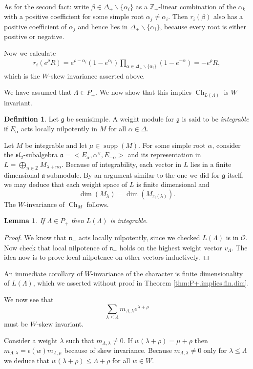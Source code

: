 \documentclass[12pt]{article}
\theoremstyle{plain}
\newtheorem{lemma}[thm]{Lemma}
\theoremstyle{definition}
\newtheorem{defn}{Definition}[section]
\numberwithin{equation}{section}
\DeclareMathOperator{\supp}{supp}
\DeclareMathOperator{\ch}{Ch}
\newcommand{\al}{\alpha}
\newcommand{\la}{\lambda}
\newcommand{\La}{\Lambda}
\newcommand{\eps}{\epsilon}
\newcommand{\D}{\Delta}
\newcommand{\Z}{\mathbb{Z}}
\newcommand{\g}{\mathfrak{g}}
\newcommand{\n}{\mathfrak{n}}
\newcommand{\sll}{\mathfrak{sl}}
\newcommand{\OO}{\mathcal{O}}
\newcommand{\ma}{\mathfrak{a}}
\begin{document}
As for the second fact: write $\beta \in \D_+ \backslash \{\al_i\}$ as a $\Z_+$-linear combination of the $\al_k$ with a positive coefficient for some simple root $\al_j \neq \al_i$. Then $r_i(\beta)$ also has a positive coefficient of $\al_j$ and hence lies in $\D_+ \backslash \{\al_i\}$, because every root is either positive or negative.

Now we calculate
\begin{align*}
r_i(e^\rho R)
%
= e^{\rho-\al_i} (1 - e^{\al_i}) \prod_{\al \in \D_+ \backslash \{\al_i\}} (1 - e^{-\al})
%
= -e^\rho R,
\end{align*}
which is the $W$-skew invariance asserted above.

We have assumed that $\La \in P_+$. We now show that this implies $\ch_{L(\La)}$ is $W$-invariant.
\begin{defn}
Let $\g$ be semisimple. A weight module for $\g$ is said to be \emph{integrable} if $E_{\al}$ acts locally nilpotently in $M$ for all $\al \in \D$.
\end{defn}
Let $M$ be integrable and let $\mu \in \supp(M)$. For some simple root $\al$, consider the $\sll_2$-subalgebra $\ma = <E_\al, \al^\vee, E_{-\al}>$ and its representation in $L = \bigoplus_{n \in \Z} M_{\la + n \al}$. Because of integrability, each vector in $L$ lies in a finite dimensional $\ma$-submodule. By an argument similar to the one we did for $\g$ itself, we may deduce that each weight space of $L$ is finite dimensional and
\[
\dim(M_\la) = \dim(M_{r_i(\la)}).
\]
The $W$-invariance of $\ch_{M}$ follows.
\begin{lemma}
If $\La \in P_+$ then $L(\La)$ is integrable.
\end{lemma}

\begin{proof}
We know that $\n_+$ acts locally nilpotently, since we checked $L(\La)$ is in $\OO$. Now check that local nilpotence of $\n_-$ holds on the highest weight vector $v_\La$. The idea now is to prove local nilpotence on other vectors inductively.
\end{proof}

An immediate corollary of $W$-invariance of the character is finite dimensionality of $L(\La)$, which we asserted without proof in Theorem \ref{thm:P+.implies.fin.dim}.

We now see that
\[
\sum_{\la \leq \La} m_{\La, \la} e^{\la+\rho}
\]
must be $W$-skew invariant.

Consider a weight $\la$ such that $m_{\La, \la} \neq 0$. If $w(\la+\rho) = \mu+\rho$ then $m_{\La, \la} = \eps(w) m_{\La, \mu}$ because of skew invariance. Because $m_{\La, \la} \neq 0$ only for $\la \leq \La$ we deduce that $w(\la+\rho) \leq \La+\rho$ for all $w \in W$.
\end{document}
